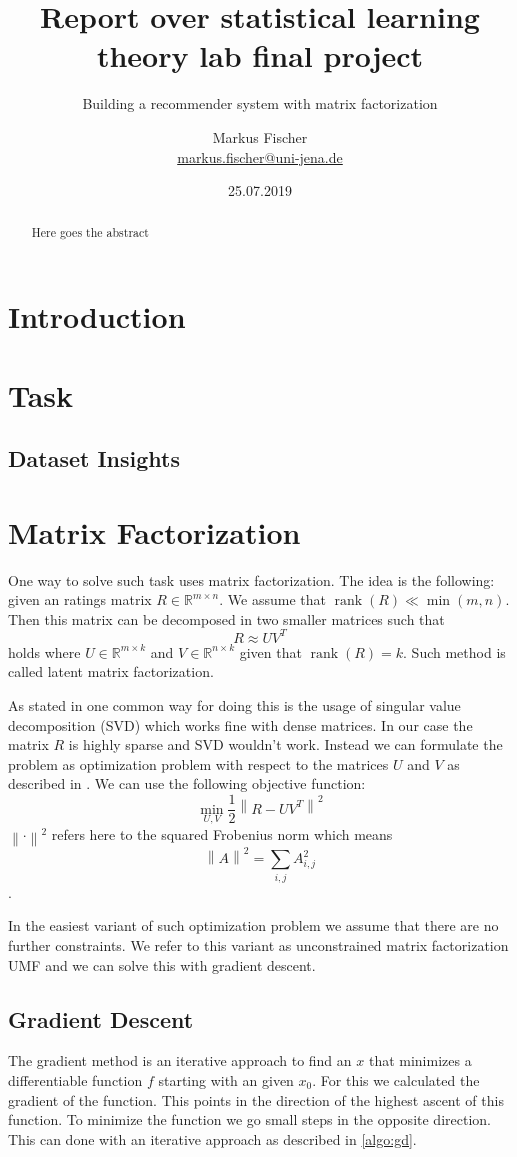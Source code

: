 \documentclass[DIV=12]{scrartcl}
\title{Report over statistical learning theory lab final project}
\subtitle{Building a recommender system with matrix factorization}
\author{Markus Fischer\\ \small{\href{mailto:markus.fischer@uni-jena.de}{markus.fischer@uni-jena.de}}}
\date{25.07.2019}
\DeclareMathOperator{\rank}{rank}
\newcommand{\norm}[1]{\left\lVert#1\right\rVert}
\begin{document}
\maketitle
\begin{abstract}
Here goes the abstract
\end{abstract}

\section{Introduction}
\section{Task}
\subsection{Dataset Insights}

\section{Matrix Factorization}
One way to solve such task uses matrix factorization. The idea is the following: given an ratings matrix $R\in\mathbb{R}^{m\times n}$. We assume that $\rank(R)\ll\min(m,n)$. Then this matrix can be decomposed in two smaller matrices such that 
$$R\approx UV^T$$ holds where $U\in\mathbb{R}^{m\times k}$ and $V\in\mathbb{R}^{n\times k}$ given that $\rank(R)=k$. Such method is called latent matrix factorization.

As stated in \cite{KoBeVo09} one common way for doing this is the usage of singular value decomposition (SVD) which works fine with dense matrices. In our case the matrix $R$ is highly sparse and SVD wouldn't work. Instead we can formulate the problem as optimization problem with respect to the matrices $U$ and $V$ as described in \cite{Ag16}. We can use the following objective function: 
$$\min_{U,V} \frac{1}{2}\norm{R-UV^T}^2$$ 
$\norm{\cdot}^2$ refers here to the squared Frobenius norm which means $$\norm{A}^2=\sum_{i,j}A_{i,j}^2$$.

In the easiest variant of such optimization problem we assume that there are no further constraints. We refer to this variant as unconstrained matrix factorization UMF and we can solve this with gradient descent.

\subsection{Gradient Descent}
The gradient method is an iterative approach to find an $x$ that minimizes a differentiable function $f$ starting with an given $x_0$. For this we calculated the gradient of the function. This points in the direction of the highest ascent of this function. To minimize the function we go small steps in the opposite direction. This can done with an iterative approach as described in \ref{algo:gd}. 
\end{document}
